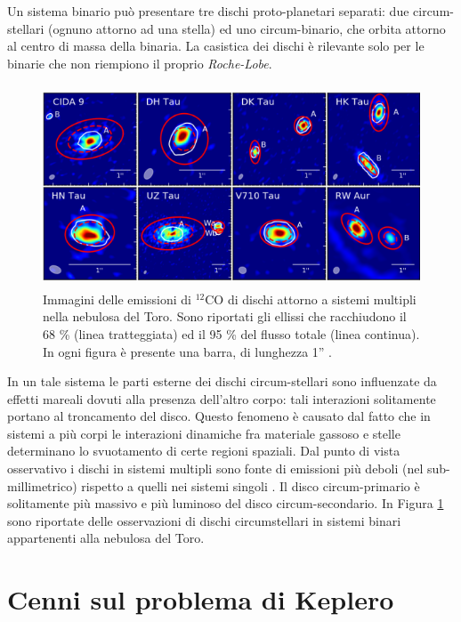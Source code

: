 Un sistema binario può presentare tre dischi proto-planetari separati: due circum-stellari (ognuno attorno ad una stella) ed uno circum-binario, che orbita attorno al centro di massa della binaria. La casistica dei dischi è rilevante solo per le binarie che non riempiono il proprio \textit{Roche-Lobe}.
\begin{figure}[h]
    \centering
    \includegraphics[height=6cm, width=14cm]{Immagini/IntroTeorica/DischiRota.png}
    \caption{Immagini delle emissioni di $^{12}$CO di dischi attorno a sistemi multipli nella nebulosa del Toro. Sono riportati gli ellissi che racchiudono il 68 \% (linea tratteggiata) ed il 95 \% del flusso totale (linea continua). In ogni figura è presente una barra, di lunghezza 1'' \parencite{OsservazioniRota}.}
    \label{fig:oss_rota}
\end{figure}
In un tale sistema le parti esterne dei dischi circum-stellari sono influenzate da effetti mareali dovuti alla presenza dell'altro corpo: tali interazioni solitamente portano al troncamento del disco.
Questo fenomeno è causato dal fatto che in sistemi a più corpi le interazioni dinamiche fra materiale gassoso e stelle determinano lo svuotamento di certe regioni spaziali.
Dal punto di vista osservativo i dischi in sistemi multipli sono fonte di emissioni più deboli (nel sub-millimetrico) rispetto a quelli nei sistemi singoli \parencite{DimDisc}.
Il disco circum-primario è solitamente più massivo e più luminoso del disco circum-secondario. In Figura \ref{fig:oss_rota} sono riportate delle osservazioni di dischi circumstellari in sistemi binari appartenenti alla nebulosa del Toro.


\section{Cenni sul problema di Keplero} \label{sec:Keplero}

